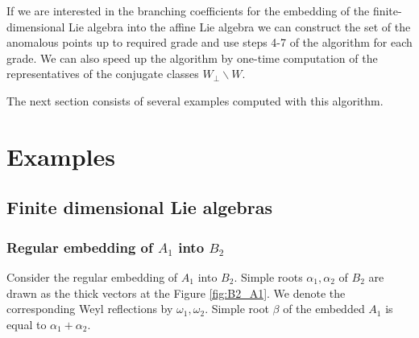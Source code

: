 \documentclass[a4paper,12pt]{article}
\theoremstyle{definition} \newtheorem{Def}{Definition}
\begin{document}
If we are interested in the branching coefficients for the embedding of the finite-dimensional Lie algebra into the affine Lie algebra we can construct the set of the anomalous points up to required grade and use steps 4-7 of the algorithm for each grade. We can also speed up the algorithm by one-time computation of the representatives of the conjugate classes $W_{\bot}\backslash W$.

The next section consists of several examples computed with this algorithm.

\section{Examples}
\label{sec:examples}

\subsection{Finite dimensional Lie algebras}
\label{sec:finite-dimens-lie}

\subsubsection{Regular embedding of $A_1$ into $B_2$}
\label{sec:regul-embedd-a_1}

Consider the regular embedding of $A_1$ into $B_2$. Simple roots $\alpha_1, \alpha_2$ of $B_2$ are drawn as the thick vectors at the Figure \ref{fig:B2_A1}. We denote the corresponding Weyl reflections by $\omega_1, \omega_2$. Simple root $\beta$ of the embedded $A_1$ is equal to $\alpha_1+\alpha_2$.
\end{document}
